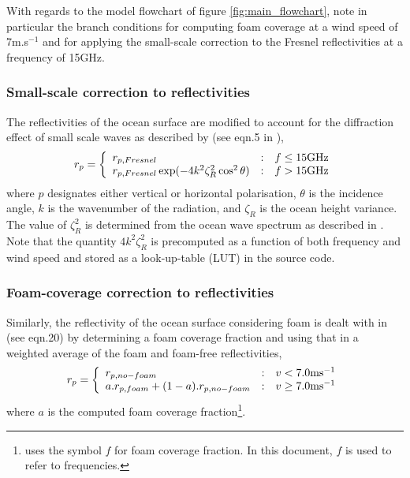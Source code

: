 With regards to the model flowchart of figure \ref{fig:main_flowchart}, note in particular the branch conditions for computing foam coverage at a wind speed of 7m.s$^{-1}$ and for applying the small-scale correction to the Fresnel reflectivities at a frequency of 15GHz.

\subsubsection{Small-scale correction to reflectivities}
\label{sec:small_scale_correction}
The reflectivities of the ocean surface are modified to account for the diffraction effect of small scale waves as described by \citet{GuissardSobieski_1987} (see eqn.5 in \citet{Kazumori_2008}),
\begin{equation}
  r_p = \left\{ \begin{array}{l@{\quad:\quad}l}
                  r_{p,Fresnel}                                 & f \le 15\textrm{GHz}\\
                  r_{p,Fresnel}\exp(-4k^2\zeta^2_R\cos^2\theta) & f > 15\textrm{GHz}
                \end{array} \right.
  \label{eqn:small_scale_correction}
\end{equation}
where $p$ designates either vertical or horizontal polarisation, $\theta$ is the incidence angle, $k$ is the wavenumber of the radiation, and $\zeta_R$ is the ocean height variance. The value of $\zeta^2_R$ is determined from the ocean wave spectrum as described in \citet{BjerkaasRiedel_1979}. Note that the quantity $4k^2\zeta^2_R$ is precomputed as a function of both frequency and wind speed and stored as a look-up-table (LUT) in the source code.

\subsubsection{Foam-coverage correction to reflectivities}
\label{sec:foam_coverage_correction}
Similarly, the reflectivity of the ocean surface considering foam is dealt with in \citet{Kazumori_2008} (see eqn.20) by determining a foam coverage fraction and using that in a weighted average of the foam and foam-free reflectivities,
\begin{equation}
  r_p = \left\{ \begin{array}{l@{\quad:\quad}l}
                  r_{p,no-foam}                      & v < \textrm{7.0ms}^{-1}\\
                  a.r_{p,foam} + (1-a).r_{p,no-foam} & v \ge \textrm{7.0ms}^{-1}
                \end{array} \right.
  \label{eqn:foam_coverage_correction}
\end{equation}
where $a$ is the computed foam coverage fraction\footnote{\citet{Kazumori_2008} uses the symbol $f$ for foam coverage fraction. In this document, $f$ is used to refer to frequencies.}.


